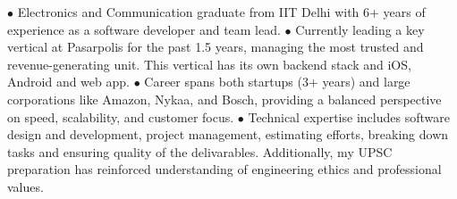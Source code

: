 \documentclass[9pt]{developercv} %
\begin{document}
\vspace{0.5cm}



\begin{minipage}[t]{0.6\textwidth} %
	\vspace{-\baselineskip} %
	
	 $\bullet$ Electronics and Communication graduate from IIT Delhi with 6+ years of experience as a software developer and team lead. $\bullet$ Currently leading a key vertical at Pasarpolis for the past 1.5 years, managing the most trusted and revenue-generating unit. This vertical has its own backend stack and iOS, Android and web app. $\bullet$ Career spans both startups (3+ years) and large corporations like Amazon, Nykaa, and Bosch, providing a balanced perspective on speed, scalability, and customer focus. $\bullet$ Technical expertise includes software design and development, project management, estimating efforts, breaking down tasks and ensuring quality of the delivarables. Additionally, my UPSC preparation has reinforced understanding of engineering ethics and professional values.\\ \\%
\end{minipage}
\hfill %
\begin{minipage}[t]{0.35\textwidth} %
	\vspace{-\baselineskip} %
	\begin{barchart}{4} %
	\end{barchart}
\end{minipage}


\end{document}
